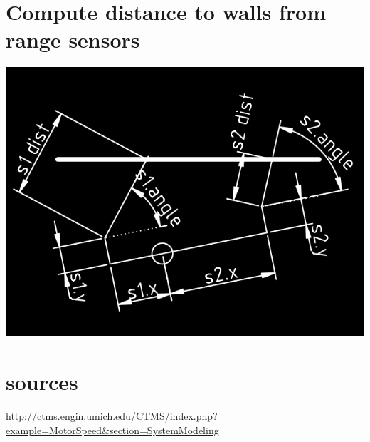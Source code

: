 \documentclass{article}
\begin{document}
\section{Compute distance to walls from range sensors}

\includegraphics[width=1\linewidth]{./sensor_to_wall_diagram.png}

\section{sources}
\url{http://ctms.engin.umich.edu/CTMS/index.php?example=MotorSpeed&section=SystemModeling}
\end{document}
